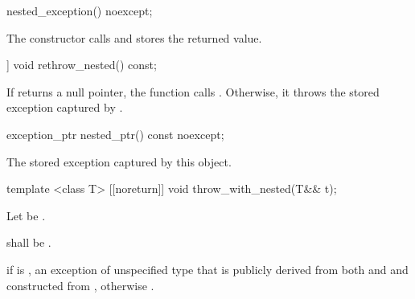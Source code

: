\begin{itemdecl}
nested_exception() noexcept;
\end{itemdecl}

\begin{itemdescr}
\pnum
\effects The constructor calls  and stores the returned value.
\end{itemdescr}

\begin{itemdecl}
[[noreturn]] void rethrow_nested() const;
\end{itemdecl}

\begin{itemdescr}
\pnum
\effects If  returns a null pointer, the function calls .
Otherwise, it throws the stored exception captured by .
\end{itemdescr}

\begin{itemdecl}
exception_ptr nested_ptr() const noexcept;
\end{itemdecl}

\begin{itemdescr}
\pnum
\returns The stored exception captured by this  object.
\end{itemdescr}

\begin{itemdecl}
template <class T> [[noreturn]] void throw_with_nested(T&& t);
\end{itemdecl}

\begin{itemdescr}
\pnum
Let  be .

\pnum
\requires {} shall be .

\pnum
\throws
if 
is ,
an exception of unspecified type that is publicly derived from both
 and 
and constructed from , otherwise
.
\end{itemdescr}

